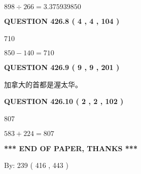 \documentclass{ctexart}
\begin{document}
$ %
898 \div  %
266=   %
3.375939850$
 
 
  
\vspace{0.2in}
  
{\textbf{\Large{QUESTION
426.8 
 ( 4 , 4 , 104 )
}}}
  
  
 
 
\noindent{}

710
 
 
 
 
\noindent{}

$ %
850 -  %
140=   %
710$
 
 
  
\vspace{0.2in}
  
{\textbf{\Large{QUESTION
426.9 
 ( 9 , 9 , 201 )
}}}
  
  
 
 
\noindent{}
 
 
加拿大的首都是渥太华。
 
 
 
 
  
\vspace{0.2in}
  
{\textbf{\Large{QUESTION
426.10 
 ( 2 , 2 , 102 )
}}}
  
  
 
 
\noindent{}

807
 
 
 
 
\noindent{}

$ %
583 +  %
224=   %
807$
 
 
   
   
 \vspace{0.2in}
 
   
   
   
   
\vspace{1.0in} 
{\textbf{\large{ *** END OF PAPER, THANKS *** }}} 
   
   
\hspace{1.0in} By: 
 239 ( 416 ,  443 )
   
\end{document}
